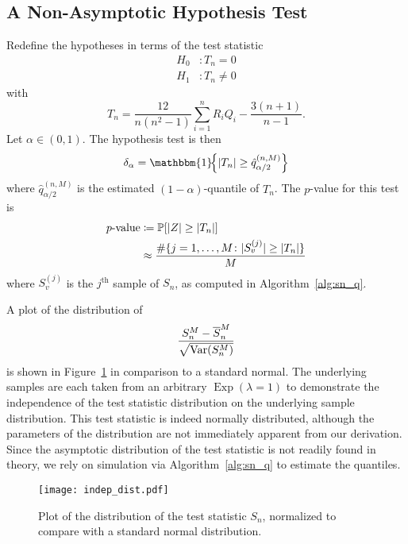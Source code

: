 \documentclass[letterpaper, reqno]{amsart}
\numberwithin{equation}{section}
\newcommand{\Prob}[1]{\mathbb{P}\mleft[#1\mright]}
\newcommand{\Var}[1]{\operatorname{Var}\mleft(#1\mright)}
\newcommand{\indic}[1]{\mathbbm{1}\!\mleft\{#1\mright\}} %
\newcommand{\sumi}[2]{\sum_{#1=1}^{#2}}
\begin{document}
\subsection{A Non-Asymptotic Hypothesis Test}
Redefine the hypotheses in terms of the test statistic
\begin{align*}
  H_0 &\colon T_n = 0 \\
  H_1 &\colon T_n \ne 0
\end{align*}
with
\[ T_n = \frac{12}{n(n^2 - 1)} \sumi{i}{n}R_iQ_i - \frac{3(n+1)}{n-1}. \]
Let $\alpha \in (0, 1)$. The hypothesis test is then
\[ \delta_\alpha = \indic{|T_n| \ge \hat{q}_{\alpha/2}^{(n, M)}} \]
where $\hat{q}_{\alpha/2}^{(n, M)}$ is the estimated $(1 - \alpha)$-quantile
of $T_n$. The $p$-value for this test is
\begin{align*}
  \text{$p$-value} &\coloneqq \Prob{|Z| \ge |T_n|} \\
  &\approx \frac{\#\{j=1,\dots,M \colon |S_v^{(j)}| \ge |T_n|\}}{M}
\end{align*}
where $S_v^{(j)}$ is the $j^{\text{th}}$ sample of $S_n$, as computed in
Algorithm~\ref{alg:sn_q}.

A plot of the distribution of 
\[ \frac{S_n^M - \overline{S}_n^M}{\sqrt{\Var{S_n^M}}} \]
is shown in Figure~\ref{fig:Sn} in comparison to a standard normal. The
underlying samples are each taken from an arbitrary
$\operatorname{Exp}(\lambda=1)$ to demonstrate the independence of the test
statistic distribution on the underlying sample distribution. This test
statistic is indeed normally distributed, although the parameters of the
distribution are not immediately apparent from our derivation. Since the
asymptotic distribution of the test statistic is not readily found in theory, we
rely on simulation via Algorithm~\ref{alg:sn_q} to estimate the quantiles.

\begin{figure}[!h]
  \centering
  \texttt{[image: indep\_dist.pdf]}
  \caption{Plot of the distribution of the test statistic $S_n$, normalized to
    compare with a standard normal distribution.}
  \label{fig:Sn}
\end{figure}


% 
\end{document}
